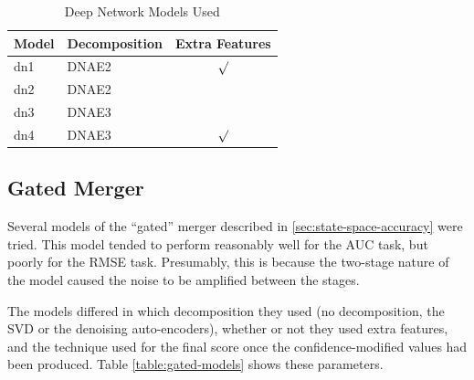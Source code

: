 \documentclass{article}
\begin{document}
\begin{table}
\caption{Deep Network Models Used}
\label{table:deep-net-models}
\vskip 0.15in
\begin{center}
\begin{small}
\begin{sc}
\begin{tabular}{llc}
\hline
\abovespace\belowspace
Model & Decomposition & Extra Features \\
\hline
\abovespace
dn1   & DNAE2  & $\surd$  \\
dn2   & DNAE2  &   \\
dn3   & DNAE3  &   \\
\belowspace
dn4   & DNAE3  & $\surd$  \\
\hline
\end{tabular}
\end{sc}
\end{small}
\end{center}
\vskip -0.1in
\end{table}


\subsection{Gated Merger}

Several models of the ``gated'' merger described in \ref{sec:state-space-accuracy} were tried.  This model tended to perform reasonably well for the AUC task, but poorly for the RMSE task.  Presumably, this is because the two-stage nature of the model caused the noise to be amplified between the stages.

The models differed in which decomposition they used (no decomposition, the SVD or the denoising auto-encoders), whether or not they used extra features, and the technique used for the final score once the confidence-modified values had been produced.  Table \ref{table:gated-models} shows these parameters.
\end{document}
